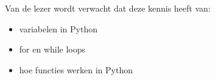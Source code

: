 Van de lezer wordt verwacht dat deze kennis heeft van:
\begin{itemize}
\item variabelen in Python
\item for en while loops
\item hoe functies werken in Python
\end{itemize}

